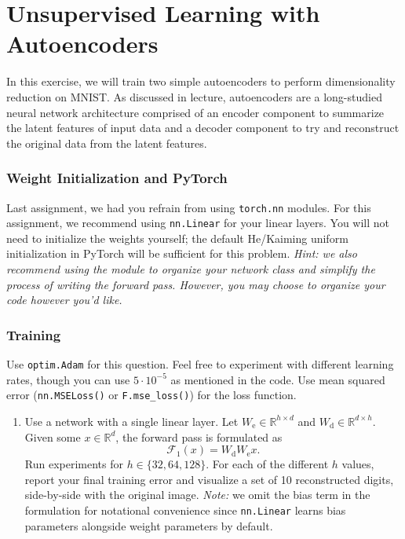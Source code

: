 \documentclass{article}
\begin{document}
\section*{Unsupervised Learning with Autoencoders}
\begin{aprob}
In this exercise, we will train two simple autoencoders to perform
dimensionality reduction on MNIST. As discussed in lecture, autoencoders are a
long-studied neural network architecture comprised of an encoder component to
summarize the latent features of input data and a decoder component to try and
reconstruct the original data from the latent features.

\subsubsection*{Weight Initialization and PyTorch}
Last assignment, we had you refrain from using \texttt{torch.nn} modules. For
this assignment, we recommend using \texttt{nn.Linear} for your linear layers.
You will not need to initialize the weights yourself; the default
He/Kaiming uniform initialization in PyTorch will be sufficient for this problem. \emph{Hint: we also recommend using the  module to organize your
network class and simplify the process of writing the forward pass. However, you may choose to organize your code however you'd like.}
\subsubsection*{Training}
Use \texttt{optim.Adam} for this question. Feel free to experiment with different learning rates, though you can use $5 \cdot 10^{-5}$ as mentioned in the code. Use mean
squared error (\texttt{nn.MSELoss()} or \texttt{F.mse\_loss()}) for the loss function.

\begin{enumerate}
  \item {} Use a network with a single linear layer. Let $W_{\text{e}} \in \mathbb{R}^{h \times d}$ and
    $W_{\text{d}} \in \mathbb{R}^{d\times h}$. Given some $x \in \mathbb{R}^d$,
    the forward pass is formulated as \[
      \mathcal{F}_{1}(x) = W_{\text{d}} W_{\text{e}} x
    .\]
    Run experiments for $h \in \{ 32, 64, 128 \}$. For
    each of the different $h$ values, report your final training error and visualize a
    set of 10 reconstructed digits, side-by-side with the original image. \emph{Note:} we omit the bias term in the formulation
    for notational convenience since \texttt{nn.Linear} learns bias
    parameters alongside weight parameters by default.
    

\end{enumerate}
\end{aprob}
\end{document}
